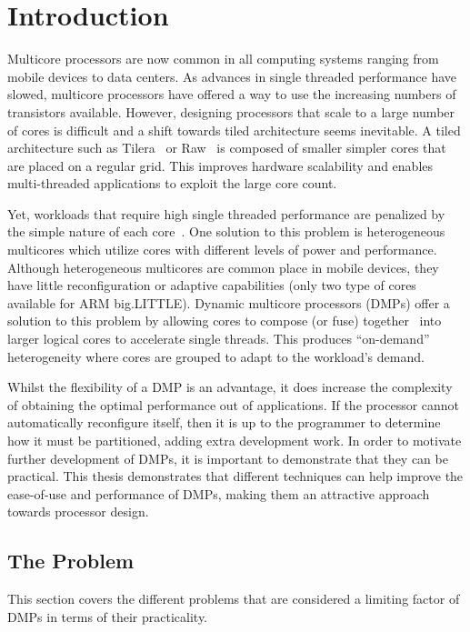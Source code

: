 \chapter{Introduction}
Multicore processors are now common in all computing systems ranging from mobile devices to data centers.
As advances in single threaded performance have slowed, multicore processors have offered a way to use the increasing numbers of transistors available.
However, designing processors that scale to a large number of cores is difficult and a shift towards tiled architecture seems inevitable.
A tiled architecture such as Tilera~\cite{bell2008tile} or Raw~\cite{waingold1997raw} is composed of smaller simpler cores that are placed on a regular grid.
This improves hardware scalability and enables multi-threaded applications to exploit the large core count.

Yet, workloads that require high single threaded performance are penalized by the simple nature of each core~\cite{eyerman2010amdahl}.
One solution to this problem is heterogeneous multicores which utilize cores with different levels of power and performance.
Although heterogeneous multicores are common place in mobile devices, they have little reconfiguration or adaptive capabilities (\eg only two type of cores available for ARM big.LITTLE).
Dynamic multicore processors (DMPs) offer a solution to this problem by allowing cores to compose (or fuse) together~\cite{ipek2007CoreFusion} into larger logical cores to accelerate single threads.
This produces ``on-demand'' heterogeneity where cores are grouped to adapt to the workload's demand.

Whilst the flexibility of a DMP is an advantage, it does increase the complexity of obtaining the optimal performance out of applications.
If the processor cannot automatically reconfigure itself, then it is up to the programmer to determine how it must be partitioned, adding extra development work.
In order to motivate further development of DMPs, it is important to demonstrate that they can be practical.
This thesis demonstrates that different techniques can help improve the ease-of-use and performance of DMPs, making them an attractive approach towards processor design. 

\section{The Problem}
This section covers the different problems that are considered a limiting factor of DMPs in terms of their practicality.
